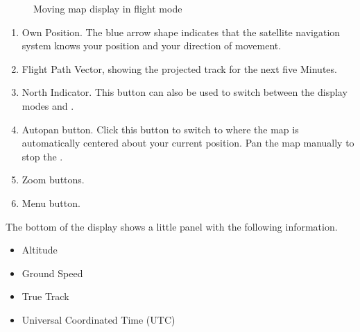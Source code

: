 \documentclass[letterpaper,10pt,english]{sphinxmanual}
\begin{document}
\begin{figure}[htbp]
\centering
\capstart

\noindent{}
\caption{Moving map display in flight mode}\label{\detokenize{01-intro/02-getting_started:id2}}\label{\detokenize{01-intro/02-getting_started:movingmapflightmode}}\end{figure}
\begin{enumerate}
%
\item {} 
\sphinxAtStartPar
Own Position.  The blue arrow shape indicates that the satellite navigation
system knows your position and your direction of movement.

\item {} 
\sphinxAtStartPar
Flight Path Vector, showing the projected track for the next five Minutes.

\item {} 
\sphinxAtStartPar
North Indicator.  This button can also be used to switch between the display
modes  and .

\item {} 
\sphinxAtStartPar
Autopan button.  Click this button to switch to  where the map
is automatically centered about your current position.  Pan the map manually
to stop the .

\item {} 
\sphinxAtStartPar
Zoom buttons.

\item {} 
\sphinxAtStartPar
Menu button.

\end{enumerate}

\sphinxAtStartPar
The bottom of the display shows a little panel with the following information.
\begin{itemize}
\item {} 
\sphinxAtStartPar
Altitude

\item {} 
\sphinxAtStartPar
Ground Speed

\item {} 
\sphinxAtStartPar
True Track

\item {} 
\sphinxAtStartPar
Universal Coordinated Time (UTC)

\end{itemize}
\end{document}
